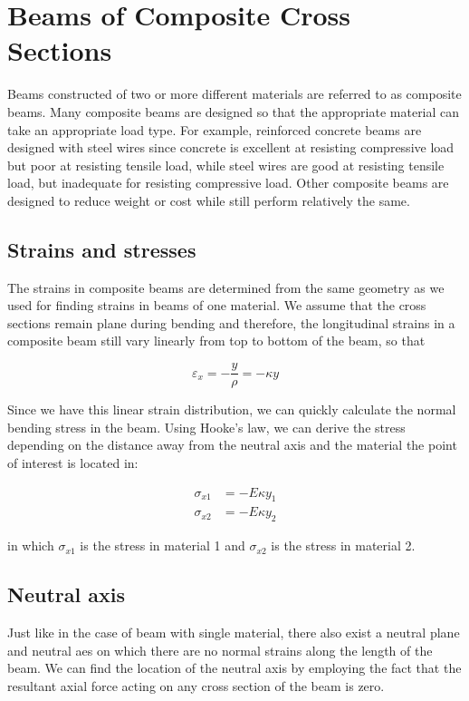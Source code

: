 \documentclass[
10pt,
a4paper,
openany,
svgnames,
]{book} %
\begin{document}
\section{Beams of Composite Cross Sections}

Beams constructed of two or more different materials are referred to as composite beams. Many composite beams are designed so that the appropriate material can take an appropriate load type. For example, reinforced concrete beams are designed with steel wires since concrete is excellent at resisting compressive load but poor at resisting tensile load, while steel wires are good at resisting tensile load, but inadequate for resisting compressive load. Other composite beams are designed to reduce weight or cost while still perform relatively the same.

\subsection{Strains and stresses}

The strains in composite beams are determined from the same geometry as we used for finding strains in beams of one material. We assume that the cross sections remain plane during bending and therefore, the longitudinal strains in a composite beam still vary linearly from top to bottom of the beam, so that

\begin{equation}
  {\varepsilon _x} =  - \frac{y}{\rho } =  - \kappa y
\end{equation}

Since we have this linear strain distribution, we can quickly calculate the normal bending stress in the beam. Using Hooke’s law, we can derive the stress depending on the distance away from the neutral axis and the material the point of interest is located in:

\begin{align}
  {\sigma _{x1}} &=  - E\kappa {y_1}  \nonumber \\
  {\sigma _{x2}} &=  - E\kappa {y_2} 
\end{align}

in which $\sigma_{x1}$ is the stress in material 1 and $\sigma_{x2}$ is the stress in material 2.

\subsection{Neutral axis}

Just like in the case of beam with single material, there also exist a neutral plane and neutral aes on which there are no normal strains along the length of the beam. We can find the location of the neutral axis by employing the fact that the resultant axial force acting on any cross section of the beam is zero.
\end{document}
